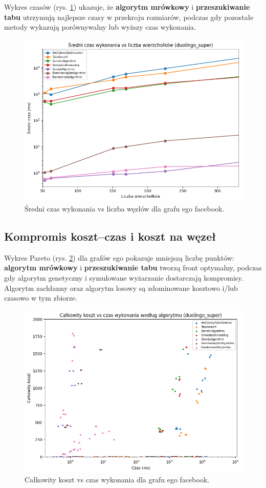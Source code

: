 Wykres czasów (rys. \ref{fig:facebook_time_vs_nodes}) ukazuje, że \textbf{algorytm mrówkowy} i \textbf{przeszukiwanie tabu} utrzymują najlepsze czasy w przekroju rozmiarów, podczas gdy pozostałe metody wykazują porównywalny lub wyższy czas wykonania.

\begin{figure}[H]
  \centering
  \includegraphics[width=0.7\linewidth]{assets/figures/facebook_time_vs_nodes.png}
  \caption{Średni czas wykonania vs liczba węzłów dla grafu ego facebook.}
  \label{fig:facebook_time_vs_nodes}
\end{figure}

\subsection{Kompromis koszt--czas i koszt na węzeł}

Wykres Pareto (rys. \ref{fig:facebook_pareto}) dla grafów ego pokazuje mniejszą liczbę punktów: \textbf{algorytm mrówkowy} i \textbf{przeszukiwanie tabu} tworzą front optymalny, podczas gdy algorytm genetyczny i symulowane wyżarzanie dostarczają kompromisy. Algorytm zachłanny oraz algorytm losowy są zdominowane kosztowo i/lub czasowo w tym zbiorze.

\begin{figure}[H]
  \centering
  \includegraphics[width=0.7\linewidth]{assets/figures/facebook_pareto.png}
  \caption{Całkowity koszt vs czas wykonania dla grafu ego facebook.}
  \label{fig:facebook_pareto}
\end{figure}

